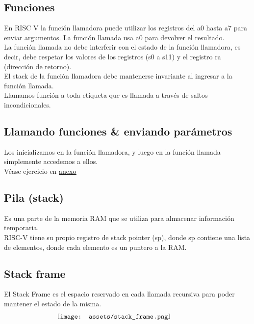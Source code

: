 \documentclass[10pt,a4paper]{article}
\begin{document}
\subsection*{Funciones}
En RISC V la función llamadora puede utilizar los registros del a0 hasta a7 para enviar argumentos. La función llamada usa a0 para devolver el resultado. \\

La función llamada no debe interferir con el estado de la función llamadora, es decir, debe respetar los valores de los registros (s0 a s11) y el registro ra (dirección de retorno). \\

El stack de la función llamadora debe mantenerse invariante al ingresar a la función llamada. \\

Llamamos función a toda etiqueta que es llamada a través de saltos incondicionales.
\subsection*{Llamando funciones \& enviando parámetros}
Los inicializamos en la función llamadora, y luego en la función llamada simplemente accedemos a ellos. \\ 
Véase ejercicio en \hyperref[ejercicio:saltos_condicionales_argumentos]{\underline{anexo}}
\subsection*{Pila (stack)}
Es una parte de la memoria RAM que se utiliza para almacenar información temporaria. \\ 

RISC-V tiene su propio registro de stack pointer (sp), donde sp contiene una lista de elementos, donde cada elemento es un puntero a la RAM.  \\
\subsection*{Stack frame}
El Stack Frame es el espacio reservado en cada llamada recursiva para poder mantener el estado de la misma.
\[\begin{minipage}[b]{0.6\textwidth}
    \texttt{[image: assets/stack\_frame.png]}
    \label{fig:stack_frame}
\end{minipage}\]
\end{document}
